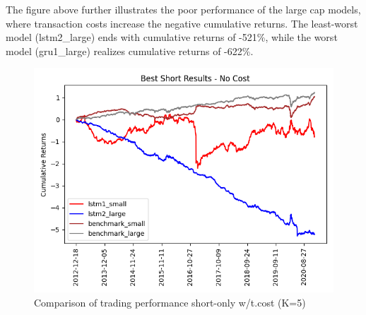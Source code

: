 \indent\newline 
The figure above further illustrates the poor performance of the large cap models, where transaction costs increase the negative cumulative returns. The least-worst model (lstm2\_large) ends with cumulative returns of -521\%, while the worst model (gru1\_large) realizes cumulative returns of -622\%.

\indent\newline 
\begin{table}[ht]
\centering
{}
\caption{Comparison of trading performance short-only w/t.cost (K=5)}
\end{table}
\indent\newline 
\begin{figure}[H]
\centering
\includegraphics [scale=0.60,angle=360]{figures/cumulative_best_short_mix_return_cost.png}
\caption{Comparison of trading performance short-only w/t.cost (K=5)}
\label{fig:shortcomparisonc}
\end{figure} 
